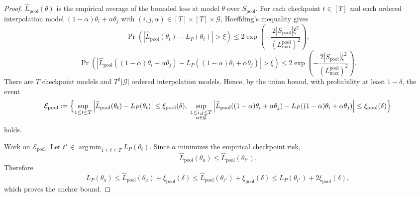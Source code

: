 \documentclass{article}
\newcommand{\argmin}{\operatorname*{arg\,min}}
\newcommand{\abs}[1]{\left\lvert #1 \right\rvert}
\newcommand{\paren}[1]{\left( #1 \right)}
\begin{document}
\begin{proof}
\(\widehat L_{\mathrm{pool}}(\theta)\) is the empirical average of the bounded loss at model \(\theta\) over \(S_{\mathrm{pool}}\). For each checkpoint \(t\in[T]\) and each ordered interpolation model \((1-\alpha)\theta_i+\alpha\theta_j\) with \((i,j,\alpha)\in[T]\times[T]\times\mathcal G\), Hoeffding's inequality gives
\[
\Pr\!\paren{
\abs{\widehat L_{\mathrm{pool}}(\theta_t)-L_P(\theta_t)} > \xi
}
\le
2\exp\!\paren{
-\frac{2\abs{S_{\mathrm{pool}}}\xi^2}{(L_{\max}^{\mathrm{pool}})^2}
},
\]
\[
\Pr\!\paren{
\abs{\widehat L_{\mathrm{pool}}\!\paren{(1-\alpha)\theta_i+\alpha\theta_j} - L_P\!\paren{(1-\alpha)\theta_i+\alpha\theta_j}} > \xi
}
\le
2\exp\!\paren{
-\frac{2\abs{S_{\mathrm{pool}}}\xi^2}{(L_{\max}^{\mathrm{pool}})^2}
}.
\]
There are \(T\) checkpoint models and \(T^2\abs{\mathcal G}\) ordered interpolation models. Hence, by the union bound, with probability at least \(1-\delta\), the event
\[
\mathcal E_{\mathrm{pool}}
:=
\Bigl\{
\sup_{1\le t\le T}\abs{\widehat L_{\mathrm{pool}}(\theta_t)-L_P(\theta_t)}\le \xi_{\mathrm{pool}}(\delta),\
\sup_{\substack{1\le i,j\le T\\ \alpha\in\mathcal G}}
\abs{
\widehat L_{\mathrm{pool}}\!\paren{(1-\alpha)\theta_i+\alpha\theta_j}
-
L_P\!\paren{(1-\alpha)\theta_i+\alpha\theta_j}
}
\le \xi_{\mathrm{pool}}(\delta)
\Bigr\}
\]
holds.

Work on \(\mathcal E_{\mathrm{pool}}\). Let \(t^\star\in\argmin_{1\le t\le T} L_P(\theta_t)\). Since \(a\) minimizes the empirical checkpoint risk,
\[
\widehat L_{\mathrm{pool}}(\theta_a)\le \widehat L_{\mathrm{pool}}(\theta_{t^\star}).
\]
Therefore
\[
L_P(\theta_a)
\le
\widehat L_{\mathrm{pool}}(\theta_a) + \xi_{\mathrm{pool}}(\delta)
\le
\widehat L_{\mathrm{pool}}(\theta_{t^\star}) + \xi_{\mathrm{pool}}(\delta)
\le
L_P(\theta_{t^\star}) + 2\xi_{\mathrm{pool}}(\delta),
\]
which proves the anchor bound.


\end{proof}
\end{document}
